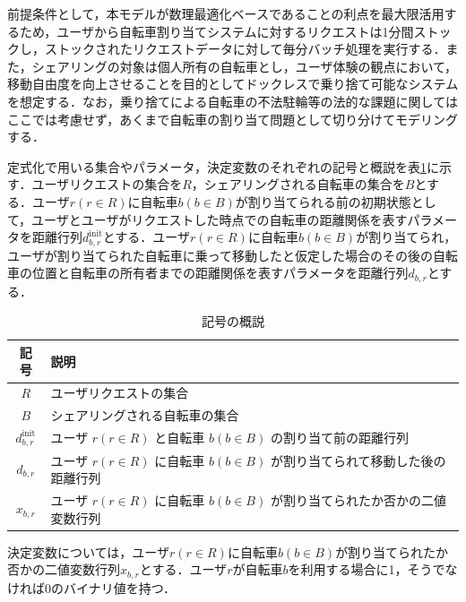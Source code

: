           \par 前提条件として，本モデルが数理最適化ベースであることの利点を最大限活用するため，ユーザから自転車割り当てシステムに対するリクエストは1分間ストックし，ストックされたリクエストデータに対して毎分バッチ処理を実行する．また，シェアリングの対象は個人所有の自転車とし，ユーザ体験の観点において，移動自由度を向上させることを目的としてドックレスで乗り捨て可能なシステムを想定する．なお，乗り捨てによる自転車の不法駐輪等の法的な課題に関してはここでは考慮せず，あくまで自転車の割り当て問題として切り分けてモデリングする．
          
          \par 定式化で用いる集合やパラメータ，決定変数のそれぞれの記号と概説を表\ref{tab:記号の概説}に示す．ユーザリクエストの集合を$R$，シェアリングされる自転車の集合を$B$とする．ユーザ$r (r \in R)$に自転車$b (b \in B)$が割り当てられる前の初期状態として，ユーザとユーザがリクエストした時点での自転車の距離関係を表すパラメータを距離行列$d^{\text{init}}_{b,r}$とする．ユーザ$r (r \in R)$に自転車$b (b \in B)$が割り当てられ，ユーザが割り当てられた自転車に乗って移動したと仮定した場合のその後の自転車の位置と自転車の所有者までの距離関係を表すパラメータを距離行列$d_{b,r}$とする．
          
          \begin{table}[htbp]
            \caption{記号の概説}
            \label{tab:記号の概説}
            \centering
            \begin{tabular}{c p{6cm}}
              \hline 
              記号 & 説明 \\
              \hline
              $R$ & ユーザリクエストの集合 \\
              $B$ & シェアリングされる自転車の集合 \\
              $d^{\text{init}}_{b,r}$ & ユーザ $r(r \in R)$ と自転車 $b(b \in B)$ の割り当て前の距離行列\\
              $d_{b,r}$ & ユーザ $r (r \in R)$ に自転車 $b (b \in B)$ が割り当てられて移動した後の距離行列 \\
              $x_{b,r}$ & ユーザ $r (r \in R)$ に自転車 $b (b \in B)$ が割り当てられたか否かの二値変数行列 \\
              \hline
            \end{tabular}
          \end{table}
          
          \par 決定変数については，ユーザ$r (r \in R)$に自転車$b (b \in B)$が割り当てられたか否かの二値変数行列$x_{b,r}$とする．ユーザ$r$が自転車$b$を利用する場合に1，そうでなければ0のバイナリ値を持つ．
          
